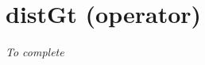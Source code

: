 \section{distGt (operator)}\label{distgt:distgtoperator}\hypertarget{distgt:distgtoperator}{}

\emph{To complete}